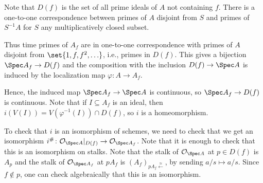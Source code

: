 Note that $D(f)$ is the set of all prime ideals of $A$ not containing $f$. There
is a one-to-one correspondence between primes of $A$ disjoint from $S$ and primes of
$S^{-1}A$ for $S$ any multiplicatively closed subset.

Thus time primes of $A_f$ are in one-to-one correspondence with primes of
$A$ disjoint from $\set{1, f, f^2, \ldots}$, i.e., primes in $D(f)$. This
gives a bijection $\Spec A_f \to D(f)$ and the composition with
the inclusion $D(f) \to \Spec A$ is induced by the localization map $\varphi\colon A\to A_f$.

Hence, the induced map $\Spec A_f\to \Spec A$ is continuous, so $\Spec A_f\to D(f)$
is continuous. Note that if $I \subseteq A_f$ is an ideal, then $i(V(I)) = V(\varphi^{-1}(I))\cap D(f)$,
so $i$ is a homeomorphism.

To check that $i$ is an isomorphism of schemes, we need to check that we get an
isomorphism $i^\#\colon \mathcal{O}_{\Spec A}|_{D(f)}\to \mathcal{O}_{\Spec A_f}$.
Note that it is enough to check that this is an isomorphism on stalks. Note
that the stalk of $\mathcal{O}_{\Spec A}$ at $p \in D(f)$ is $A_p$ and the
stalk of $\mathcal{O}_{\Spec A_f}$ at $pA_f$ is $(A_f)_{pA_f\stackrel{\cong}{\longleftarrow}}$,
by sending $a/s \mapsto a/s$. Since $f\notin p$, one can check algebraically that this
is an isomorphism.
